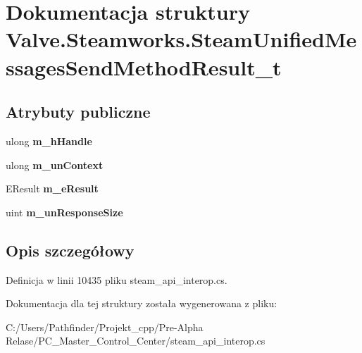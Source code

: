 \hypertarget{struct_valve_1_1_steamworks_1_1_steam_unified_messages_send_method_result__t}{}\section{Dokumentacja struktury Valve.\+Steamworks.\+Steam\+Unified\+Messages\+Send\+Method\+Result\+\_\+t}
\label{struct_valve_1_1_steamworks_1_1_steam_unified_messages_send_method_result__t}
\subsection*{Atrybuty publiczne}
\begin{DoxyCompactItemize}
\item 
\mbox{\label{struct_valve_1_1_steamworks_1_1_steam_unified_messages_send_method_result__t_aed66e43e4abba574f6e1076f2a3f59ae}} 
ulong {\bfseries m\+\_\+h\+Handle}
\item 
\mbox{\label{struct_valve_1_1_steamworks_1_1_steam_unified_messages_send_method_result__t_acacb85dc58fabff73f17ceba8de97135}} 
ulong {\bfseries m\+\_\+un\+Context}
\item 
\mbox{\label{struct_valve_1_1_steamworks_1_1_steam_unified_messages_send_method_result__t_a29ae66d6551e8b4798f39cd79f4f5304}} 
E\+Result {\bfseries m\+\_\+e\+Result}
\item 
\mbox{\label{struct_valve_1_1_steamworks_1_1_steam_unified_messages_send_method_result__t_a966740fda5b072f3ad6232741e70170b}} 
uint {\bfseries m\+\_\+un\+Response\+Size}
\end{DoxyCompactItemize}


\subsection{Opis szczegółowy}


Definicja w linii 10435 pliku steam\+\_\+api\+\_\+interop.\+cs.



Dokumentacja dla tej struktury została wygenerowana z pliku\+:\begin{DoxyCompactItemize}
\item 
C\+:/\+Users/\+Pathfinder/\+Projekt\+\_\+cpp/\+Pre-\/\+Alpha Relase/\+P\+C\+\_\+\+Master\+\_\+\+Control\+\_\+\+Center/steam\+\_\+api\+\_\+interop.\+cs\end{DoxyCompactItemize}
